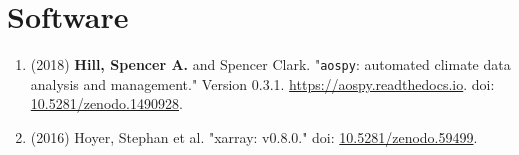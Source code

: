 \documentclass[12pt,letterpaper]{shillcv}
\begin{document}
\section*{Software}
\label{sec:org6b01799}
\begin{enumerate}
\item (2018) \textbf{Hill, Spencer A.} and Spencer Clark.  "\texttt{aospy}: automated climate
data analysis and management."  Version 0.3.1.  \url{https://aospy.readthedocs.io}.
doi: \href{https://doi.org/10.5281/zenodo.1490928}{10.5281/zenodo.1490928}.
\item (2016) Hoyer, Stephan et al.  "xarray: v0.8.0."  doi: \href{https://doi.org/10.5281/zenodo.59499}{10.5281/zenodo.59499}.
\end{enumerate}
\end{document}
